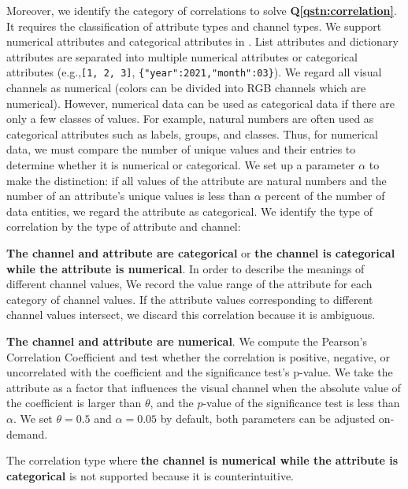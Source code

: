 Moreover, we identify the category of correlations to solve \textbf{Q\ref{qstn:correlation}}.
It requires the classification of attribute types and channel types.
We support numerical attributes and categorical attributes in \ApproachName.
List attributes and dictionary attributes are separated into multiple numerical attributes or categorical attributes (e.g.,\texttt{[1, 2, 3]}, \texttt{\{"year":2021,"month":03\}}).
We regard all visual channels as numerical (colors can be divided into RGB channels which are numerical).
However, numerical data can be used as categorical data if there are only a few classes of values.
For example, natural numbers are often used as categorical attributes such as labels, groups, and classes.
Thus, for numerical data, we must compare the number of unique values and their entries to determine whether it is numerical or categorical.
We set up a parameter $\alpha$ to make the distinction: if all values of the attribute are natural numbers and
the number of an attribute's unique values is less than $\alpha$ percent of the number of data entities, we regard the attribute as categorical.
We identify the type of correlation by the type of attribute and channel:
\begin{compactitem}
    \item \textbf{The channel and attribute are categorical} or \textbf{the channel is categorical while the attribute is numerical}. 
    In order to describe the meanings of different channel values,
    We record the value range of the attribute for each category of channel values.
    If the attribute values corresponding to different channel values intersect, we discard this correlation because it is ambiguous.
    
    \item \textbf{The channel and attribute are numerical}. We compute the Pearson's Correlation Coefficient and test whether the correlation is positive, negative, or uncorrelated with the coefficient and the significance test's p-value. We take the attribute as a factor that influences the visual channel when the absolute value of the coefficient is larger than $\theta$, and the $p$-value of the significance test is less than $\alpha$. We set $\theta = 0.5$ and $\alpha = 0.05$ by default, both parameters can be adjusted on-demand.
\end{compactitem}
The correlation type where \textbf{the channel is numerical while the attribute is categorical} is not supported because it is counterintuitive.




